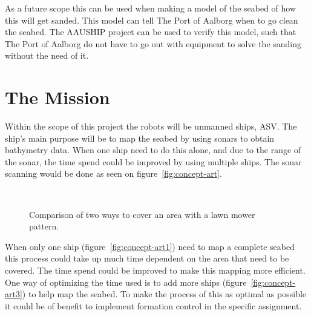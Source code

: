 As a future scope this can be used when making a model of the seabed of how this will get sanded. This model can tell The Port of Aalborg when to go clean the seabed. The AAUSHIP project can be used to verify this model, such that The Port of Aalborg do not have to go out with equipment to solve the sanding without the need of it.

\section{The Mission}
\label{sc:mission}
Within the scope of this project the robots will be unmanned ships,
\ac{ASV}. The ship's main purpose will be to map the seabed by using
sonars to obtain bathymetry data. When one ship need to do this alone, and due to the range of
the sonar, the time spend could be improved by using multiple ships. The sonar scanning would
be done as seen on figure~\vref{fig:concept-art}.

\begin{figure}[htbp]
	\centering
	\ %
	\caption{Comparison of two ways to cover an area with a lawn mower
	pattern.}
	\label{fig:concept-art}
\end{figure}

When only one ship (figure~\vref{fig:concept-art1}) need to map a complete seabed this process could
take up much time dependent on the area that need to be covered. The
time spend could be improved to make this mapping more efficient. One
way of optimizing the time used is to add more ships (figure~\vref{fig:concept-art3}) to help map the
seabed. To make the process of this as optimal as possible it could be
of benefit to implement formation control in the specific assignment.

